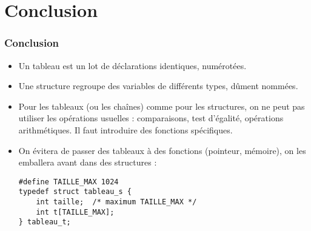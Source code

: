 \documentclass[xcolor=pdftex,svgnames,table]{beamer}
\begin{document}
\section{Conclusion}
\begin{frame}[fragile]
  \frametitle{Conclusion}
  \begin{itemize}
    \item Un tableau est un \alert{lot de  déclarations
      identiques}, numérotées.
\item Une structure  \alert{regroupe
      des variables  de différents types},
      dûment nommées. \pause
\item Pour les tableaux (ou les chaînes) comme pour les structures,
  on ne peut pas utiliser les opérations usuelles : comparaisons, test
  d'égalité, opérations arithmétiques. Il faut introduire des
  fonctions spécifiques.\pause
\item On évitera de passer des tableaux à des fonctions (pointeur, mémoire), on les
  emballera avant dans des structures :
  \begin{lstlisting}
#define TAILLE_MAX 1024
typedef struct tableau_s {
    int taille;  /* maximum TAILLE_MAX */
    int t[TAILLE_MAX];
} tableau_t;
  \end{lstlisting}
  \end{itemize}
\end{frame}
\end{document}
